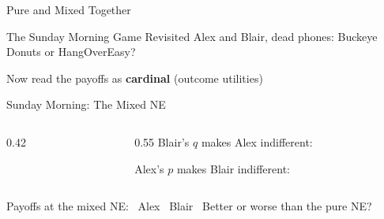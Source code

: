 
\begin{frame}[standout]
Pure and Mixed Together
\end{frame}

\begin{frame}{The Sunday Morning Game Revisited}
Alex and Blair, dead phones: Buckeye Donuts or HangOverEasy?
\bsk
\centering
\begin{matrixgame}[top={BuckyDs, HangOE}, left={BuckyDs, HangOE}, player names={Alex, Blair}, br=<2->]
\end{matrixgame}
\bsk
\raggedright
Now read the payoffs as \textbf{cardinal} (outcome utilities)
\bsk
{}
\bsk
{}
\vspace{-0.3in}
\end{frame}

\begin{frame}{Sunday Morning: The Mixed NE}
\begin{columns}[T]
\begin{column}{0.42\textwidth}
\centering
\begin{matrixgame}[top={BuckyDs, HangOE}, left={BuckyDs, HangOE}, player names={Alex, Blair}]
\end{matrixgame}
\end{column}
\begin{column}{0.55\textwidth}
Blair's $q$ makes Alex indifferent:
\vspace{0.6in}

Alex's $p$ makes Blair indifferent:
\vspace{0.6in}
\end{column}
\end{columns}
\bsk
Payoffs at the mixed NE: \ Alex \underline{\hspace{0.5in}} \ Blair \underline{\hspace{0.5in}} \ Better or worse than the pure NE?
\vspace{0.3in}
\end{frame}

